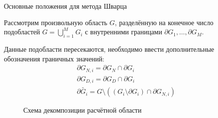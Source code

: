 \documentclass{beamer}
\begin{document}
\begin{frame}{Основные положения для метода Шварца}
\begin{multicols}{2}

Рассмотрим произвольную область $G$, разделённую на конечное число подобластей $G = \bigcup_{i=1}^{M} G_i$ с внутренними границами $\partial G_1, \ldots, \partial G_M$. 
\vspace{1cm}

Данные подобласти пересекаются, необходимо ввести дополнительные обозначения граничных значений:
\begin{equation*}
\begin{array}{l}
\partial G_{N, i} = \partial G_N \cap \partial G_i \\
\partial G_{D, i} = \partial G_D \cap \partial G_i \\
\partial \tilde{G_i} = G \setminus ((G_i \setminus \partial G_i) \cap \partial G_{N, i}) 
\end{array}
\end{equation*}

\columnbreak
\begin{figure}[h]
\caption{Схема декомпозиции расчётной области}
\end{figure}
\end{multicols}
\end{frame}
\end{document}
